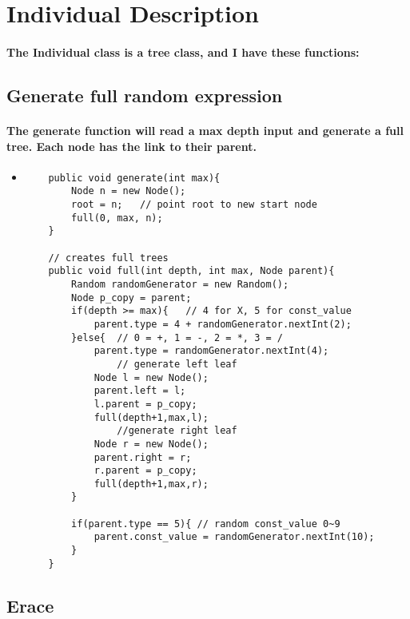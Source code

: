 \documentclass[12pt]{article}
\begin{document}
\section{Individual Description}
\paragraph{The Individual class is a tree class, and I have these functions:}
	\subsection{Generate full random expression}
	\paragraph{The generate function will read a max depth input and generate a full tree. Each node has the link to their parent.}
	\begin{itemize}
	\item
	\begin{lstlisting}
    public void generate(int max){
        Node n = new Node();
        root = n;   // point root to new start node
        full(0, max, n);
    }
    
    // creates full trees 
    public void full(int depth, int max, Node parent){
        Random randomGenerator = new Random();
        Node p_copy = parent;
        if(depth >= max){   // 4 for X, 5 for const_value
            parent.type = 4 + randomGenerator.nextInt(2);
        }else{  // 0 = +, 1 = -, 2 = *, 3 = /
            parent.type = randomGenerator.nextInt(4);
                // generate left leaf
            Node l = new Node();
            parent.left = l;
            l.parent = p_copy;
            full(depth+1,max,l);
                //generate right leaf
            Node r = new Node();
            parent.right = r;
            r.parent = p_copy;
            full(depth+1,max,r);
        }
        
        if(parent.type == 5){ // random const_value 0~9
            parent.const_value = randomGenerator.nextInt(10);
        }
    }	
	\end{lstlisting}
	\end{itemize}

	\subsection{Erace}
\end{document}
